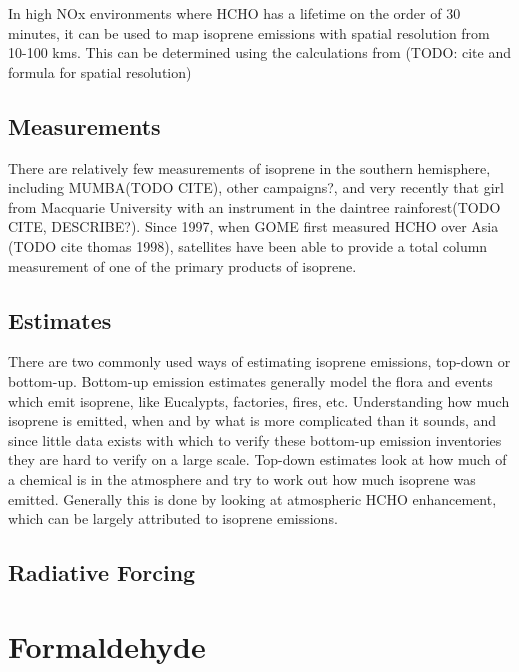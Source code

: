     In high NOx environments where HCHO has a lifetime on the order of 30 minutes, it can be used to map isoprene emissions with spatial resolution from 10-100 kms.
    This can be determined using the calculations from (TODO: cite and formula for spatial resolution)

  \subsection{Measurements}
  
    There are relatively few measurements of isoprene in the southern hemisphere, including MUMBA(TODO CITE), other campaigns?, and very recently that girl from Macquarie University with an instrument in the daintree rainforest(TODO CITE, DESCRIBE?).
    Since 1997, when GOME first measured HCHO over Asia (TODO cite thomas 1998), satellites have been able to provide a total column measurement of one of the primary products of isoprene.
  
  \subsection{Estimates}
    There are two commonly used ways of estimating isoprene emissions, top-down or bottom-up.
    Bottom-up emission estimates generally model the flora and events which emit isoprene, like Eucalypts, factories, fires, etc.
    Understanding how much isoprene is emitted, when and by what is more complicated than it sounds, and since little data exists with which to verify these bottom-up emission inventories they are hard to verify on a large scale.
    Top-down estimates look at how much of a chemical is in the atmosphere and try to work out how much isoprene was emitted. Generally this is done by looking at atmospheric HCHO enhancement, which can be largely attributed to isoprene emissions.
  
  \subsection{Radiative Forcing}

  
\section{Formaldehyde}
\label{ch1:sec:formaldehyde}
  
